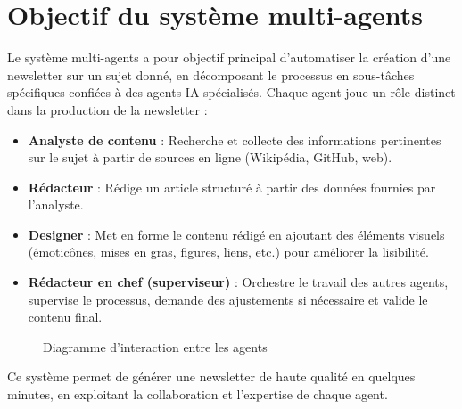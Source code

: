 \documentclass[a4paper,12pt]{article}
\begin{document}
	\section{Objectif du système multi-agents}
	Le système multi-agents a pour objectif principal d'automatiser la création d'une newsletter sur un sujet donné, en décomposant le processus en sous-tâches spécifiques confiées à des agents IA spécialisés. Chaque agent joue un rôle distinct dans la production de la newsletter :
	\begin{itemize}
		\item \textbf{Analyste de contenu} : Recherche et collecte des informations pertinentes sur le sujet à partir de sources en ligne (Wikipédia, GitHub, web).
		\item \textbf{Rédacteur} : Rédige un article structuré à partir des données fournies par l'analyste.
		\item \textbf{Designer} : Met en forme le contenu rédigé en ajoutant des éléments visuels (émoticônes, mises en gras, figures, liens, etc.) pour améliorer la lisibilité.
		\item \textbf{Rédacteur en chef (superviseur)} : Orchestre le travail des autres agents, supervise le processus, demande des ajustements si nécessaire et valide le contenu final.
	\end{itemize}
	
	\begin{figure}[H]
		\centering
		\caption{Diagramme d'interaction entre les agents}
		\label{fig:interaction}
	\end{figure}
	Ce système permet de générer une newsletter de haute qualité en quelques minutes, en exploitant la collaboration et l'expertise de chaque agent.
	
\end{document}
